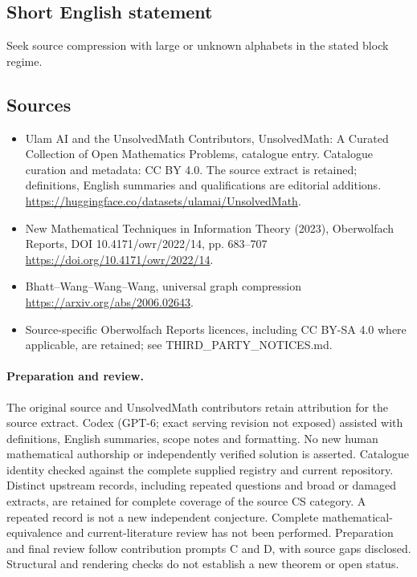 \documentclass[11pt]{article}
\begin{document}
\subsection{Short English statement}
Seek source compression with large or unknown alphabets in the stated block regime.
\subsection{Sources}
\begin{itemize}
\item[\hypertarget{source:statement:1}{S1}] Ulam AI and the UnsolvedMath Contributors, UnsolvedMath: A Curated Collection of Open Mathematics Problems, catalogue entry. Catalogue curation and metadata: CC BY 4.0. The source extract is retained; definitions, English summaries and qualifications are editorial additions.
\url{https://huggingface.co/datasets/ulamai/UnsolvedMath}.
\item[\hypertarget{source:statement:2}{S2}] New Mathematical Techniques in Information Theory (2023), Oberwolfach Reports, DOI 10.4171/owr/2022/14, pp. 683--707
\url{https://doi.org/10.4171/owr/2022/14}.
\item[\hypertarget{source:statement:3}{S3}] Bhatt--Wang--Wang--Wang, universal graph compression
\url{https://arxiv.org/abs/2006.02643}.
\item Source-specific Oberwolfach Reports licences, including CC BY-SA 4.0 where applicable, are retained; see THIRD\_PARTY\_NOTICES.md.
\end{itemize}
\paragraph{Preparation and review.}
The original source and UnsolvedMath contributors retain attribution for the source extract. Codex (GPT-6; exact serving revision not exposed) assisted with definitions, English summaries, scope notes and formatting. No new human mathematical authorship or independently verified solution is asserted. Catalogue identity checked against the complete supplied registry and current repository. Distinct upstream records, including repeated questions and broad or damaged extracts, are retained for complete coverage of the source CS category. A repeated record is not a new independent conjecture. Complete mathematical-equivalence and current-literature review has not been performed. Preparation and final review follow contribution prompts C and D, with source gaps disclosed. Structural and rendering checks do not establish a new theorem or open status.
\label{end:statement}
\end{document}
